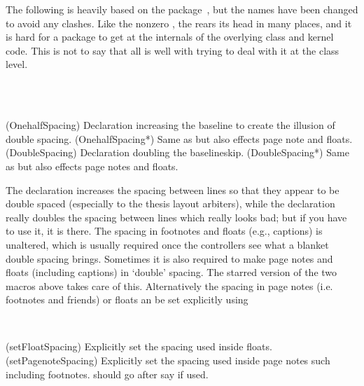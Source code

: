    The following is heavily based on the  
package~\cite{SETSPACE}, but
the names have been changed to avoid any clashes. Like the nonzero 
\lnc{\parskip}, the \lnc{\baselineskip} rears its head in many places, and 
it is hard for a package to get at the internals of the overlying class
and kernel code. This is not to say that all is well with trying to deal
with it at the class level.

\begin{syntax}
\cmd{\OnehalfSpacing} \cmd{\OnehalfSpacing*} \\
\cmd{\DoubleSpacing} \cmd{\DoubleSpacing*}\\
\end{syntax}
\glossary(OnehalfSpacing)%
  {}%
  {Declaration increasing the baseline to create the illusion of double spacing.}
\glossary(OnehalfSpacing*)%
  {}%
  {Same as  but also effects page note and floats.}
\glossary(DoubleSpacing)%
  {}%
  {Declaration doubling the baselineskip.}
\glossary(DoubleSpacing*)%
  {}%
  {Same as  but also effects page notes and floats.}

  The declaration \cmd{\OnehalfSpacing} increases the spacing between
  lines so that they appear to be double spaced (especially to the
  thesis layout arbiters), while the declaration \cmd{\DoubleSpacing}
  really doubles the spacing between lines which really looks bad; but
  if you have to use it, it is there. The spacing in footnotes and
  floats (e.g., captions) is unaltered, which is usually required once
  the controllers see what a blanket double spacing brings. Sometimes
  it is also required to make page notes and floats (including
  captions) in `double' spacing. The starred version of the two macros
  above takes care of this. Alternatively the spacing in page notes
  (i.e. footnotes and friends) or floats an be set explicitly using
\begin{syntax}
  \cmd{\setPagenoteSpacing}\\
  \cmd{\setFloatSpacing}
\end{syntax}
\glossary(setFloatSpacing)%
  {}%
  {Explicitly set the spacing used inside floats.}
\glossary(setPagenoteSpacing)%
  {}%
  {Explicitly set the spacing used inside page notes such including footnotes.}
 should go after say  if used.



